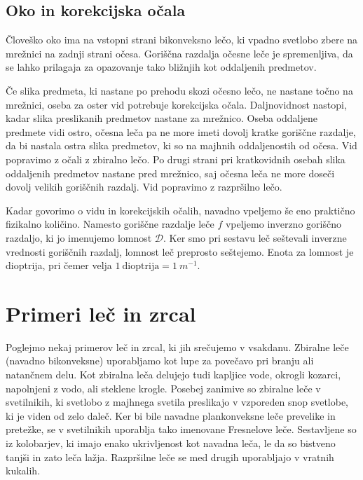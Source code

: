 \subsection*{Oko in korekcijska očala}
Človeško oko ima na vstopni strani bikonveksno lečo, ki vpadno 
svetlobo zbere na mrežnici na zadnji strani očesa. 
Goriščna razdalja očesne leče je spremenljiva, da se lahko 
prilagaja za opazovanje tako bližnjih kot oddaljenih
predmetov. 

Če slika predmeta, ki nastane po prehodu skozi očesno lečo,
ne nastane točno na mrežnici, oseba za oster vid potrebuje korekcijska očala.
Daljnovidnost nastopi, kadar slika preslikanih predmetov nastane
za mrežnico. Oseba oddaljene predmete vidi ostro, očesna leča 
pa ne more imeti dovolj kratke goriščne razdalje, da bi nastala ostra 
slika predmetov, ki so na majhnih oddaljenostih od očesa. Vid popravimo z očali z 
zbiralno lečo. Po drugi strani pri kratkovidnih osebah slika
oddaljenih predmetov nastane pred mrežnico, saj očesna leča 
ne more doseči dovolj velikih goriščnih razdalj. Vid popravimo
z razpršilno lečo. 

\begin{remark}
 Kadar govorimo o vidu in korekcijskih očalih, navadno vpeljemo
 še eno praktično fizikalno količino. Namesto goriščne razdalje
 leče $f$ vpeljemo inverzno goriščno razdaljo, ki jo imenujemo 
 lomnost $\mathcal{D}$. Ker smo pri sestavu leč seštevali inverzne
 vrednosti goriščnih razdalj, lomnost leč preprosto seštejemo. 
 Enota za lomnost je dioptrija, pri čemer velja $1~\mathrm{dioptrija} = 
 1~\si{m}^{-1}$.
\end{remark}

\section{Primeri leč in zrcal}
Poglejmo nekaj primerov leč in zrcal, ki jih srečujemo v vsakdanu. Zbiralne leče
(navadno bikonveksne) uporabljamo kot lupe za povečavo pri branju ali 
natančnem delu. Kot zbiralna leča delujejo tudi kapljice vode, okrogli 
kozarci, napolnjeni z vodo, ali steklene krogle. Posebej zanimive so zbiralne leče
v svetilnikih, ki svetlobo z majhnega svetila preslikajo v vzporeden snop svetlobe, ki 
je viden od zelo daleč. Ker bi bile navadne plankonveksne leče prevelike in pretežke, se
v svetilnikih uporablja tako imenovane Fresnelove leče. Sestavljene
so iz kolobarjev, ki imajo enako ukrivljenost kot navadna leča, le da so bistveno
tanjši in zato leča lažja. Razpršilne leče se med drugih uporabljajo v vratnih kukalih. 

